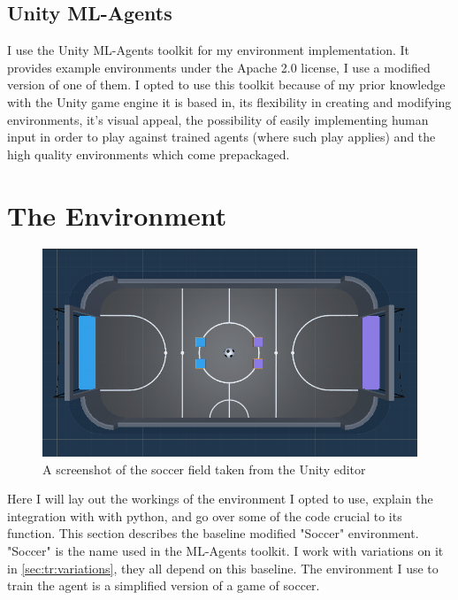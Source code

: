 \subsection{Unity ML-Agents}\label{subsec:ip:tools:ml_agents}
I use the Unity ML-Agents toolkit \cite{juliani2020unity} \cite{noauthor_unity-technologiesml-agents_2020} for my environment implementation. It provides example environments under the Apache 2.0 license, I use a modified version of one of them. 
\nolinebreak
I opted to use this toolkit because of my prior knowledge with the Unity game engine it is based in, its flexibility in creating and modifying environments, it's visual appeal, the possibility of easily implementing human input in order to play against trained agents (where such play applies) and the high quality environments which come prepackaged.


\section{The Environment}\label{sec:ip:environment}
\begin{figure}[H]
    \centering
    \includegraphics[width=0.7\linewidth]{figures/soccer_field.png}
    \caption{A screenshot of the soccer field taken from the Unity editor}
    \label{fig:soccer_field}
\end{figure}

\noindent
Here I will lay out the workings of the environment I opted to use, explain the integration with with python, and go over some of the code crucial to its function. This section describes the baseline  modified "Soccer" environment. "Soccer" is the name used in the ML-Agents toolkit. I work with variations on it in \ref{sec:tr:variations}, they all depend on this baseline. The environment I use to train the agent is a simplified version of a game of soccer. 

